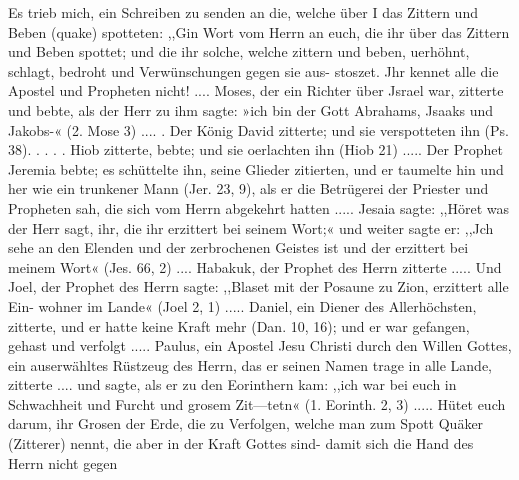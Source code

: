 Es trieb mich, ein Schreiben zu senden an die, welche über
I das Zittern und Beben (quake) spotteten:
,,Gin Wort vom Herrn an euch, die ihr über das Zittern
und Beben spottet; und die ihr solche, welche zittern und beben,
uerhöhnt, schlagt, bedroht und Verwünschungen gegen sie aus-
stoszet. Jhr kennet alle die Apostel und Propheten nicht! ....
Moses, der ein Richter über Jsrael war, zitterte und bebte,
als der Herr zu ihm sagte: »ich bin der Gott Abrahams, Jsaaks
und Jakobs-« (2. Mose 3) .... . Der König David zitterte;
und sie verspotteten ihn (Ps. 38). . . . . Hiob zitterte, bebte;
und sie oerlachten ihn (Hiob 21) ..... Der Prophet Jeremia
bebte; es schüttelte ihn, seine Glieder zitierten, und er taumelte
hin und her wie ein trunkener Mann (Jer. 23, 9), als er die
Betrügerei der Priester und Propheten sah, die sich vom Herrn
abgekehrt hatten ..... Jesaia sagte: ,,Höret was der Herr
sagt, ihr, die ihr erzittert bei seinem Wort;« und weiter sagte er:
,,Jch sehe an den Elenden und der zerbrochenen Geistes ist und
der erzittert bei meinem Wort« (Jes. 66, 2) .... Habakuk, der
Prophet des Herrn zitterte ..... Und Joel, der Prophet des
Herrn sagte: ,,Blaset mit der Posaune zu Zion, erzittert alle Ein-
wohner im Lande« (Joel 2, 1) ..... Daniel, ein Diener des
Allerhöchsten, zitterte, und er hatte keine Kraft mehr (Dan. 10, 16);
und er war gefangen, gehast und verfolgt .....
Paulus, ein Apostel Jesu Christi durch den Willen Gottes, ein
auserwähltes Rüstzeug des Herrn, das er seinen Namen trage in
alle Lande, zitterte .... und sagte, als er zu den Eorinthern
kam: ,,ich war bei euch in Schwachheit und Furcht und grosem
Zit—tetn« (1. Eorinth. 2, 3) .....
Hütet euch darum, ihr Grosen der Erde, die zu Verfolgen,
welche man zum Spott Quäker (Zitterer) nennt, die aber in der
Kraft Gottes sind- damit sich die Hand des Herrn nicht gegen


